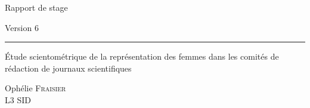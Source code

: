 
	
	\centering
	\vspace*{4.2cm}
	\par\normalfont\fontsize{35}{35}\sffamily\selectfont
	
	Rapport de stage
	
	\normalsize{Version 6}
	
	\rule{\textwidth}{1pt}
	
	\Huge{Étude scientométrique de la représentation des femmes dans les comités de rédaction de journaux scientifiques}\par
	
	\vspace*{1cm}
	{\huge Ophélie \textsc{Fraisier}\\
	\Large{L3 SID}}\par
	\vfill
	